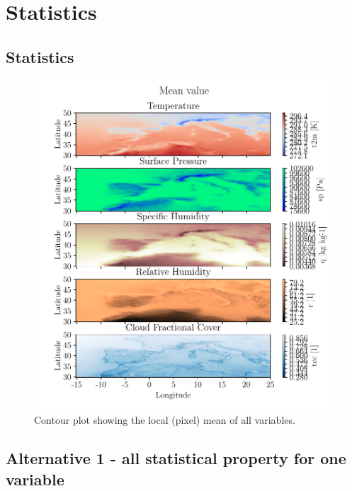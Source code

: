 \appendix
\chapter{Statistics}
\section{Statistics}
\begin{figure}[ht]
    \centering
    \includegraphics{python_figs/contourplot_all_variables_mean.pdf}
    \caption{Contour plot showing the local (pixel) mean of all variables.}
    \label{fig:contour_mean_all_vars}
\end{figure}




\section{Alternative 1 - all statistical property for one variable}

